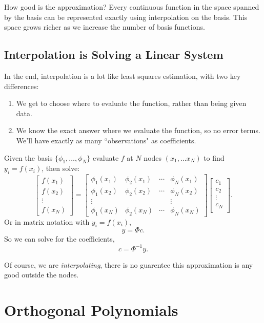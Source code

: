\documentclass[twoside]{article}
\begin{document}
How good is the approximation? Every continuous function in the space spanned by the basis can be represented exactly using interpolation on the basis. This 
space grows richer as we increase the number of basis functions. 

\subsection{Interpolation is Solving a Linear System}

In the end, interpolation is a lot like least squares estimation, with two key differences:
\begin{enumerate}
\item We get to choose where to evaluate the function, rather than being given data. 
\item We know the exact answer where we evaluate the function, so no error terms. We'll have exactly 
as many ``observations" as coefficients. 
\end{enumerate}

Given the basis $\{\phi_1, \ldots, \phi_N\}$ evaluate $f$ at $N$ nodes $(x_1, \ldots x_N)$ to find $y_i = f(x_i)$, then solve:
$$
\begin{bmatrix} 
f(x_1) \\ f(x_2) \\ \vdots \\ f(x_N)
\end{bmatrix} = 
\begin{bmatrix}
\phi_1(x_1) & \phi_2(x_1) & \cdots & \phi_N(x_1) \\
\phi_1(x_2) & \phi_2(x_2) & \cdots & \phi_N(x_2) \\
\vdots & & & \vdots \\
\phi_1(x_N) & \phi_2(x_N) & \cdots & \phi_N(x_N)
\end{bmatrix}
\begin{bmatrix}
c_1 \\ c_2 \\ \vdots \\ c_N \\
\end{bmatrix}.
$$
Or in matrix notation with $y_i = f(x_i)$,
$$ y = \Phi c. $$
So we can solve for the coefficients,
$$ c = \Phi^{-1}y. $$

Of course, we are \emph{interpolating}, there is no guarentee this approximation is any good outside the nodes.

\section{Orthogonal Polynomials}
\end{document}
